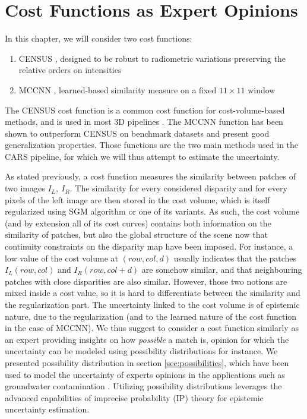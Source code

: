 \section{Cost Functions as Expert Opinions}
In this chapter, we will consider two cost functions:
\begin{enumerate}
    \item CENSUS \cite{zabih_non-parametric_1994}, designed to be robust to radiometric variations preserving the relative orders on intensities
    \item MCCNN \cite{zbontar_stereo_2016}, learned-based similarity measure on a fixed $11\times 11$ window
\end{enumerate}
The CENSUS cost function is a common cost function for cost-volume-based methods, and is used in most 3D pipelines \cite{franchis_automatic_2014,shean_automated_2016,rupnik_micmac_2017,youssefi_cars_2020}. The MCCNN function has been shown to outperform CENSUS on benchmark datasets \cite{zbontar_stereo_2016} and present good generalization properties. Those functions are the two main methods used in the CARS pipeline, for which we will thus attempt to estimate the uncertainty. 

As stated previously, a cost function measures the similarity between patches of two images \(I_L,~I_R\). The similarity for every considered disparity and for every pixels of the left image are then stored in the cost volume, which is itself regularized using SGM algorithm or one of its variants. As such, the cost volume (and by extension all of its cost curves) contains both information on the similarity of patches, but also the global structure of the scene now that continuity constraints on the disparity map have been imposed. For instance, a low value of the cost volume at \( (row, col, d) \) usually indicates that the patches \(I_L(row,col)\)  and \(I_R(row,col+d)\) are somehow similar, and that neighbouring patches with close disparities are also similar. However, those two notions are mixed inside a cost value, so it is hard to differentiate between the similarity and the regularization part. The uncertainty linked to the cost volume is of epistemic nature, due to the regularization (and to the learned nature of the cost function in the case of MCCNN). We thus suggest to consider a cost function similarly as an expert providing insights on how \textit{possible} a match is, opinion for which the uncertainty can be modeled using possibility distributions for instance. We presented possibility distribution in section \ref{sec:possibilities}, which have been used to model the uncertainty of experts opinions in the applications such as groundwater contamination \cite{bardossy_l-_1995, baudrit_joint_2007}. Utilizing possibility distributions leverages the advanced capabilities of imprecise probability (IP) theory for epistemic uncertainty estimation.

